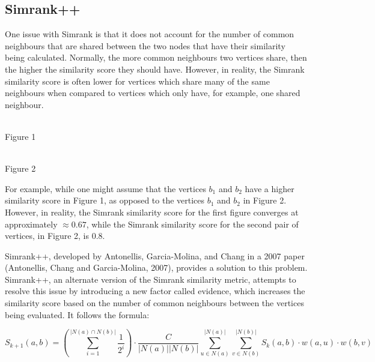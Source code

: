 \documentclass[fontsize=11pt]{article}
\begin{document}
\subsection{Simrank++}
One issue with Simrank is that it does not account for the number of common neighbours that are shared between the two nodes that have their similarity being calculated. Normally, the more common neighbours two vertices share, then the higher the similarity score they should have. However, in reality, the Simrank similarity score is often lower for vertices which share many of the same neighbours when compared to vertices which only have, for example, one shared neighbour. 

\begin{center}\\
Figure 1\\[1cm]
\\
Figure 2
\end{center}

For example, while one might assume that the vertices $b_1$ and $b_2$ have a higher similarity score in Figure 1, as opposed to the vertices $b_1$ and $b_2$ in Figure 2. However, in reality, the Simrank similarity score for the first figure converges at approximately $\approx 0.67$, while the Simrank similarity score for the second pair of vertices, in Figure 2, is 0.8. 

Simrank++, developed by Antonellis, Garcia-Molina, and Chang in a 2007 paper (Antonellis, Chang and Garcia-Molina, 2007), provides a solution to this problem. Simrank++, an alternate version of the Simrank similarity metric, attempts to resolve this issue by introducing a new factor called evidence, which increases the similarity score based on the number of common neighbours between the vertices being evaluated. It follows the formula:

\[
S_{k+1}(a, b) = \left(\sum_{i=1}^{\lvert N(a) \cap N(b) \rvert}\frac{1}{2^i}\right) \cdot \frac{C}{\lvert N(a) \rvert \lvert N(b) \rvert} \sum^{\lvert N(a) \rvert}_{u \in N(a)} \sum^{\lvert N(b) \rvert}_{v \in N(b)} S_k(a, b) \cdot w(a, u) \cdot w(b, v)
\]
\end{document}
